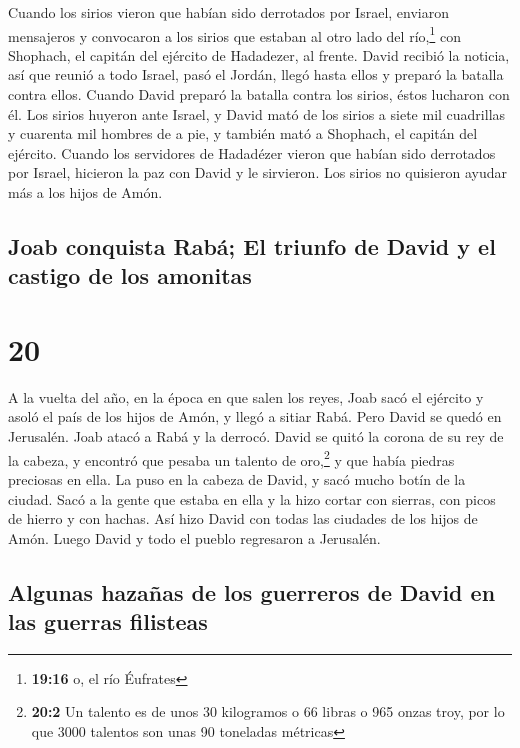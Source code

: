  Cuando los sirios vieron que habían sido derrotados por
Israel, enviaron mensajeros y convocaron a los sirios que estaban al
otro lado del río,\footnote{\textbf{19:16} o, el río Éufrates} con
Shophach, el capitán del ejército de Hadadezer, al frente.
 David recibió la noticia, así que reunió a todo Israel,
pasó el Jordán, llegó hasta ellos y preparó la batalla contra ellos.
Cuando David preparó la batalla contra los sirios, éstos lucharon con
él.  Los sirios huyeron ante Israel, y David mató de los
sirios a siete mil cuadrillas y cuarenta mil hombres de a pie, y también
mató a Shophach, el capitán del ejército.  Cuando los
servidores de Hadadézer vieron que habían sido derrotados por Israel,
hicieron la paz con David y le sirvieron. Los sirios no quisieron ayudar
más a los hijos de Amón.

\hypertarget{joab-conquista-rabuxe1-el-triunfo-de-david-y-el-castigo-de-los-amonitas}{%
\subsection{Joab conquista Rabá; El triunfo de David y el castigo de los
amonitas}\label{joab-conquista-rabuxe1-el-triunfo-de-david-y-el-castigo-de-los-amonitas}}

\hypertarget{section-19}{%
\section{20}\label{section-19}}

 A la vuelta del año, en la época en que salen los reyes,
Joab sacó el ejército y asoló el país de los hijos de Amón, y llegó a
sitiar Rabá. Pero David se quedó en Jerusalén. Joab atacó a Rabá y la
derrocó.  David se quitó la corona de su rey de la cabeza,
y encontró que pesaba un talento de oro,\footnote{\textbf{20:2} Un
  talento es de unos 30 kilogramos o 66 libras o 965 onzas troy, por lo
  que 3000 talentos son unas 90 toneladas métricas} y que había piedras
preciosas en ella. La puso en la cabeza de David, y sacó mucho botín de
la ciudad.  Sacó a la gente que estaba en ella y la hizo
cortar con sierras, con picos de hierro y con hachas. Así hizo David con
todas las ciudades de los hijos de Amón. Luego David y todo el pueblo
regresaron a Jerusalén.

\hypertarget{algunas-hazauxf1as-de-los-guerreros-de-david-en-las-guerras-filisteas}{%
\subsection{Algunas hazañas de los guerreros de David en las guerras
filisteas}\label{algunas-hazauxf1as-de-los-guerreros-de-david-en-las-guerras-filisteas}}

